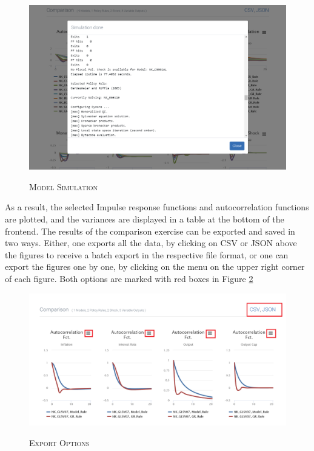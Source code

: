 \begin{figure}[H]
	\centering
	\caption{\textsc{Model Simulation}}
	\vspace{0.2cm}
	\includegraphics[width=15cm,keepaspectratio]{mmbsimul.png}\\
	\label{mmbsimul}
\end{figure}

As a result, the selected Impulse response functions and  autocorrelation functions are plotted, and the variances are displayed in a table at the bottom of the frontend. The results of the comparison exercise can be exported and saved in two ways. Either, one exports all the data, by clicking on CSV or JSON above the figures to receive a batch export in the respective file format, or one can export the figures one by one, by clicking on the menu on the upper right corner of each figure. Both options are marked with red boxes in Figure \ref{export}
\begin{figure}[H]
	\centering
	\caption{\textsc{Export Options}}
	\vspace{0.2cm}
	\includegraphics[width=15cm,keepaspectratio]{export.png}\\
	\label{export}
\end{figure}
